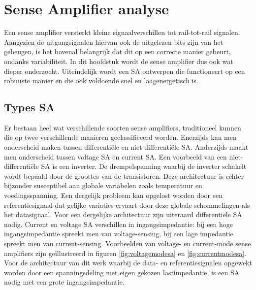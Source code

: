 \chapter{Sense Amplifier analyse}
\label{sensamp}
Een sense amplifier versterkt kleine signaalverschillen tot rail-tot-rail signalen. Aangezien de uitgangsignalen hiervan ook de uitgelezen bits zijn van het geheugen, is het bovenal belangrijk dat dit op een correcte manier gebeurt, ondanks variabiliteit.
In dit hoofdstuk wordt de sense amplifier dus ook wat dieper onderzocht. Uiteindelijk wordt een SA ontwerpen die functioneert op een robuuste manier en die ook voldoende snel en laagenergetisch is.

\section{Types SA}
Er bestaan heel wat verschillende soorten sense amplifiers, traditioneel kunnen die op twee verschillende manieren geclassificeerd worden. Enerzijds kan men onderscheid maken tussen differentiële en niet-differentiële SA. Anderzijds maakt men onderscheid tussen voltage SA en current SA. Een voorbeeld van een niet-differentiële SA is een inverter. De drempelspanning waarbij de inverter schakelt wordt bepaald door de groottes van de transistoren. Deze architectuur is echter bijzonder susceptibel aan globale variabelen zoals temperatuur en voedingsspanning. Een dergelijk probleem kan opgelost worden door een referentiesignaal dat gelijke variaties ervaart door deze globale schommelingen als het datasignaal. Voor een dergelijke architectuur zijn uiteraard differentiële SA nodig. Current en voltage SA verschillen in ingangsimpedantie: bij een hoge ingangsimpedantie spreekt men van voltage-sensing, bij een lage impedantie spreekt men van current-sensing. Voorbeelden van voltage- en current-mode sense amplifiers zijn geïllustreerd in figuren \ref{fig:voltagemodesa} en \ref{fig:currentmodesa}. Voor de architectuur van dit werk waarbij de data- en referentiesignalen opgewekt worden door een spanningsdeling met eigen gekozen lastimpedantie, is een SA nodig met een grote ingangsimpedantie.

